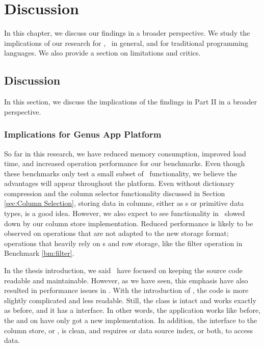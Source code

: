 \chapter{Discussion}
\label{chap:Discussion}

In this chapter, we discuss our findings in a broader perspective. We study the implications of our research for \gap, \mde~in general, and for traditional programming languages. We also provide a section on limitations and critics. 

\clearpage

\section{Discussion}
\label{sec:Discussion}

In this section, we discuss the implications of the findings in Part II in a broader perspective.

\subsection{Implications for Genus App Platform}
\label{sub:Implications for Genus App Platform}
So far in this research, we have reduced memory consumption, improved load time, and increased operation performance for our benchmarks. Even though these benchmarks only test a small subset of \gap~functionality, we believe the advantages will appear throughout the platform. Even without dictionary compression and the column selector functionality discussed in Section \ref{sec:Column Selection}, storing data in columns, either as s or primitive data types, is a good idea. However, we also expect to see functionality in \gap~slowed down by our column store implementation. Reduced performance is likely to be observed on operations that are not adapted to the new storage format; operations that heavily rely on s and row storage, like the filter operation in Benchmark \ref{bm:filter}.

In the thesis introduction, we said \genus~have focused on keeping the source code readable and maintainable. However, as we have seen, this emphasis have also resulted in performance issues in \gap. With the introduction of , the code is more slightly complicated and less readable. Still, the  class is intact and works exactly as before, and it has a  interface. In other words, the application works like before, the  and  on  have only got a new implementation. In addition, the interface to the column store, or , is clean, and requires  or data source index, or both, to access data.

